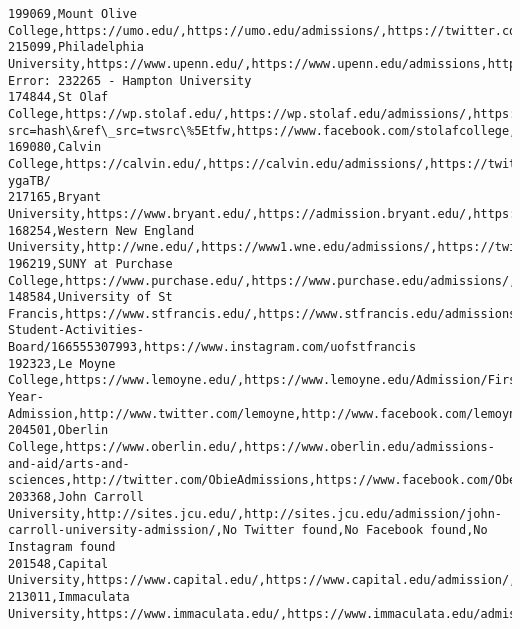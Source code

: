 \documentclass[11pt]{article}
\begin{document}
\begin{Verbatim}[commandchars=\\\{\}]
199069,Mount Olive College,https://umo.edu/,https://umo.edu/admissions/,https://twitter.com/OfficialUMO,https://www.facebook.com/universityofmountolive,https://www.instagram.com/officialumo/
215099,Philadelphia University,https://www.upenn.edu/,https://www.upenn.edu/admissions,http://twitter.com/Penn,https://www.facebook.com/UnivPennsylvania,http://instagram.com/uofpenn
Error: 232265 - Hampton University
174844,St Olaf College,https://wp.stolaf.edu/,https://wp.stolaf.edu/admissions/,https://twitter.com/hashtag/spooky?src=hash\&ref\_src=twsrc\%5Etfw,https://www.facebook.com/stolafcollege,https://www.instagram.com/p/Bop3sNNHqAz/
169080,Calvin College,https://calvin.edu/,https://calvin.edu/admissions/,https://twitter.com/calvincollege,https://www.facebook.com/calvincollege,https://www.instagram.com/p/Bpabi-ygaTB/
217165,Bryant University,https://www.bryant.edu/,https://admission.bryant.edu/,https://twitter.com/BryantHonors,https://facebook.com/bryantuniversity,https://instagram.com/bryantuniversity
168254,Western New England University,http://wne.edu/,https://www1.wne.edu/admissions/,https://twitter.com/wneuniversity/,https://www.facebook.com/WesternNewEnglandUniversity/,https://www.instagram.com/wneuniversity/
196219,SUNY at Purchase College,https://www.purchase.edu/,https://www.purchase.edu/admissions/,https://twitter.com/SUNY\_Purchase,https://www.facebook.com/SUNYPurchaseCollege,https://www.instagram.com/purchasecollege/
148584,University of St Francis,https://www.stfrancis.edu/,https://www.stfrancis.edu/admissions/,https://twitter.com/UofStFrancis,https://www.facebook.com/pages/USF-Student-Activities-Board/166555307993,https://www.instagram.com/uofstfrancis
192323,Le Moyne College,https://www.lemoyne.edu/,https://www.lemoyne.edu/Admission/First-Year-Admission,http://www.twitter.com/lemoyne,http://www.facebook.com/lemoyne,https://instagram.com/lemoyne\_college/
204501,Oberlin College,https://www.oberlin.edu/,https://www.oberlin.edu/admissions-and-aid/arts-and-sciences,http://twitter.com/ObieAdmissions,https://www.facebook.com/OberlinAdmissions/,https://www.instagram.com/oberlincollege
203368,John Carroll University,http://sites.jcu.edu/,http://sites.jcu.edu/admission/john-carroll-university-admission/,No Twitter found,No Facebook found,No Instagram found
201548,Capital University,https://www.capital.edu/,https://www.capital.edu/admission/,https://twitter.com/Capital\_U,https://www.facebook.com/CapitalU,http://instagram.com/capitalu
213011,Immaculata University,https://www.immaculata.edu/,https://www.immaculata.edu/admissions/,https://twitter.com/immaculatau,https://www.facebook.com/Immaculata.University,https://www.instagram.com/immaculatau/

\end{Verbatim}
\end{document}
